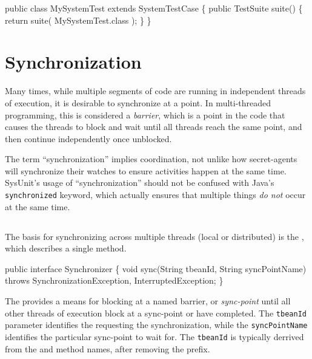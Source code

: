 \begin{codelisting}
public class MySystemTest
  extends SystemTestCase
\{
    public TestSuite suite() 
    \{
        return suite( MySystemTest.class );
    \}
\}
\end{codelisting}

\section{Synchronization}

Many times, while multiple segments of code are running in independent
threads of execution, it is desirable to synchronize at a point.  In
multi-threaded programming, this is considered a
\emph{barrier},
which is a point in the code that causes the threads to block and wait
until all threads reach the same point, and then continue
independently once unblocked.

\begin{note}
The term ``synchronization'' implies coordination, not unlike
how secret-agents will synchronize their watches to ensure 
activities happen at the same time.  SysUnit's usage of
``synchronization'' should not be confused with Java's
\texttt{synchronized} keyword, which actually ensures that
multiple things \emph{do not} occur at the same time.
\end{note}

\subsection{}

The basis for synchronizing across multiple threads (local or
distributed) is the , which describes a single
 method.  

\begin{codelisting}
public interface Synchronizer 
\{
    void sync(String tbeanId,
              String syncPointName)
        throws SynchronizationException, InterruptedException;
\}
\end{codelisting}

The  provides a means for blocking at a named
barrier, or \emph{sync-point} until all other threads of execution 
block at a sync-point or have completed.  The \texttt{tbeanId}
parameter identifies the  requesting the synchronization,
while the \texttt{syncPointName} identifies the particular sync-point
to wait for.  The \texttt{tbeanId} is typically derrived from the
 and  method names, after
removing the prefix.

